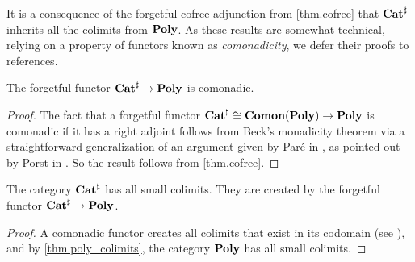 \documentclass[Book-Poly]{subfiles}
\begin{document}
It is a consequence of the forgetful-cofree adjunction from \cref{thm.cofree} that $\mathbf{Cat}^\sharp$ inherits all the colimits from $\mathbf{Poly}$.
As these results are somewhat technical, relying on a property of functors known as \emph{comonadicity}, we defer their proofs to references.

\begin{proposition}[Porst]
The forgetful functor $\mathbf{Cat}^\sharp\to\mathbf{Poly}$ is comonadic.
\end{proposition}
\begin{proof}
The fact that a forgetful functor $\mathbf{Cat}^\sharp\cong\mathbf{Comon}(\mathbf{Poly})\to\mathbf{Poly}$ is comonadic if it has a right adjoint follows from Beck's monadicity theorem via a straightforward generalization of an argument given by Par{\'e} in \cite[pp.~138-9]{pare1969absolute}, as pointed out by Porst in \cite[Fact~3.1]{porst2019colimits}.
So the result follows from \cref{thm.cofree}.
\end{proof}

\begin{corollary} \label{cor.comon_cocomp}
The category $\mathbf{Cat}^\sharp$ has all small colimits.
They are created by the forgetful functor $\mathbf{Cat}^\sharp\to\mathbf{Poly}$.
\end{corollary}
\begin{proof}
A comonadic functor creates all colimits that exist in its codomain (see \cite{nlab:created-limit}), and by \cref{thm.poly_colimits}, the category $\mathbf{Poly}$ has all small colimits.
\end{proof}
\end{document}
